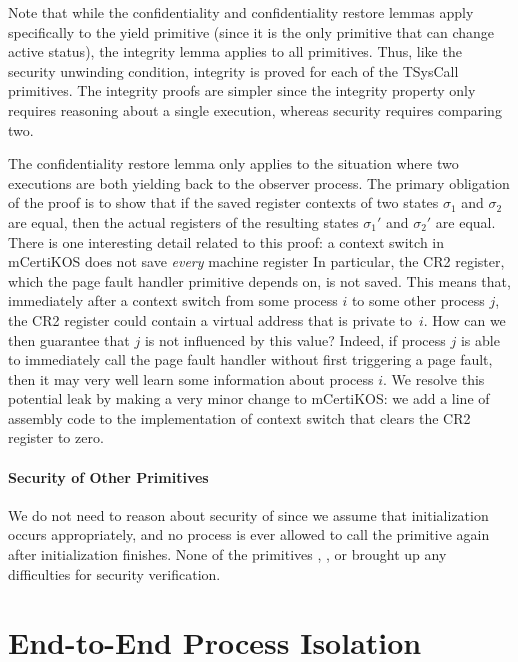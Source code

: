 Note that while the confidentiality and confidentiality restore
lemmas apply specifically to the yield primitive (since it is
the only primitive that can change active status), the
integrity lemma applies to all primitives.
Thus, like the security unwinding condition, integrity is proved 
for each of the TSysCall primitives. The integrity proofs are 
simpler since the integrity property only requires 
reasoning about a single execution, whereas security requires 
comparing two.

The confidentiality restore lemma only applies to the situation
where two executions are both yielding back 
to the observer process. The primary obligation
of the proof is to show that if the saved register contexts of two
states $\sigma_1$ and $\sigma_2$ are equal, then the actual registers
of the resulting states $\sigma_1'$ and $\sigma_2'$ are equal.
There is one interesting detail related to this proof:
a context switch in mCertiKOS does not save \emph{every} machine
register
In particular, the CR2 register, which the page fault handler
primitive depends on, is not saved. This means that, immediately
after a context switch from some process $i$ to some other process 
$j$, the CR2 register could contain a virtual address that is private 
to~$i$. How can we then guarantee that $j$ is not influenced by this
value? Indeed, if process $j$ is able to immediately call the page 
fault handler without first triggering a page fault, then it may very 
well learn some information about process $i$. We resolve this potential
leak by making a very minor change to mCertiKOS: we add a line of
assembly code to the implementation of context switch that clears
the CR2 register to zero.

\ifextended
\paragraph{Security of Other Primitives}

We do not need to reason about security of 
since we assume that initialization occurs appropriately,
and no process is ever allowed to call the primitive again after 
initialization finishes. None of the primitives , 
, or  brought up any difficulties
for security verification.
\else\fi

\section{End-to-End Process Isolation}
\label{casestudy-isolation}

